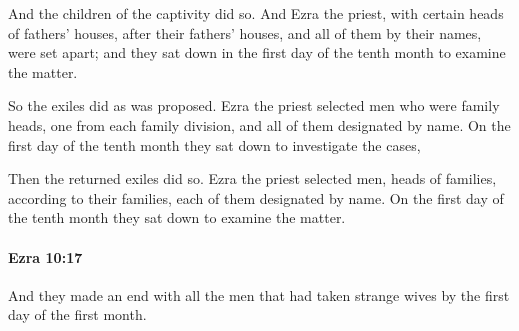			\begin{versebox}
					\item[BHS] 
					\item[LXX] 
					\item[ASV] And the children of the captivity did so. And Ezra the priest, with certain heads of fathers' houses, after their fathers' houses, and all of them by their names, were set apart; and they sat down in the first day of the tenth month to examine the matter.
					\item[NIV] So the exiles did as was proposed. Ezra the priest selected men who were family heads, one from each family division, and all of them designated by name. On the first day of the tenth month they sat down to investigate the cases,
					\item[NRSV] Then the returned exiles did so. Ezra the priest selected men, heads of families, according to their families, each of them designated by name. On the first day of the tenth month they sat down to examine the matter.
			\end{versebox}

		\paragraph{Ezra 10:17} %
			\label{EZRA-10-17}

			And they made an end with all the men that had taken strange wives by the first day of the first month.

